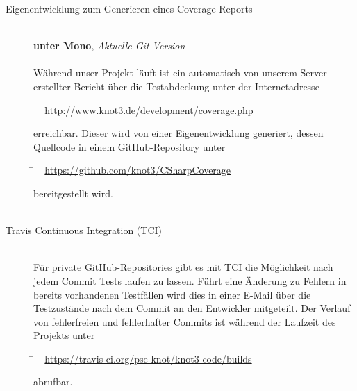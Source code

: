 \begin{description}
\clearpage



	\item[Eigenentwicklung zum Generieren eines Coverage-Reports]~\\
	\textbf{unter Mono}, \textit{Aktuelle Git-Version}\hfill
	\\
	\\
	Während unser Projekt läuft ist ein automatisch von unserem Server erstellter Bericht über die Testabdeckung unter der Internetadresse
	
	\begin{tabbing}
			\= ~ \href {http://www.knot3.de/development/coverage.php}
					   {http://www.knot3.de/development/coverage.php}
					   
	\end{tabbing} erreichbar.
	Dieser wird von einer Eigenentwicklung generiert, dessen Quellcode in einem GitHub-Repository unter
	\begin{tabbing}
			\= ~ \href {https://github.com/knot3/CSharpCoverage}
					   {https://github.com/knot3/CSharpCoverage}
					   
	\end{tabbing} bereitgestellt wird.
	\\
	\\
	
	\item[Travis Continuous Integration (TCI)] \hfill
	\\
	
	Für private GitHub-Repositories gibt es mit TCI die Möglichkeit nach jedem Commit Tests laufen zu lassen.
	Führt eine Änderung zu Fehlern in bereits vorhandenen Testfällen wird dies in einer E-Mail über die Testzustände nach dem Commit an den Entwickler mitgeteilt. Der Verlauf von fehlerfreien und fehlerhafter Commits ist während der Laufzeit des Projekts unter
	
	\begin{tabbing}
			\= ~ \href {https://travis-ci.org/pse-knot/knot3-code/builds}
		    {https://travis-ci.org/pse-knot/knot3-code/builds}
		   
	\end{tabbing} abrufbar.
	\\
	

\end{description}


